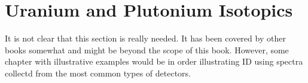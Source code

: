 \chapter{Uranium and Plutonium Isotopics}

It is not clear that this section is really needed.  It has been covered by other books somewhat and might be beyond the scope of this book.  However, some chapter with illustrative examples would be in order illustrating ID using spectra collectd from the most common types of detectors.